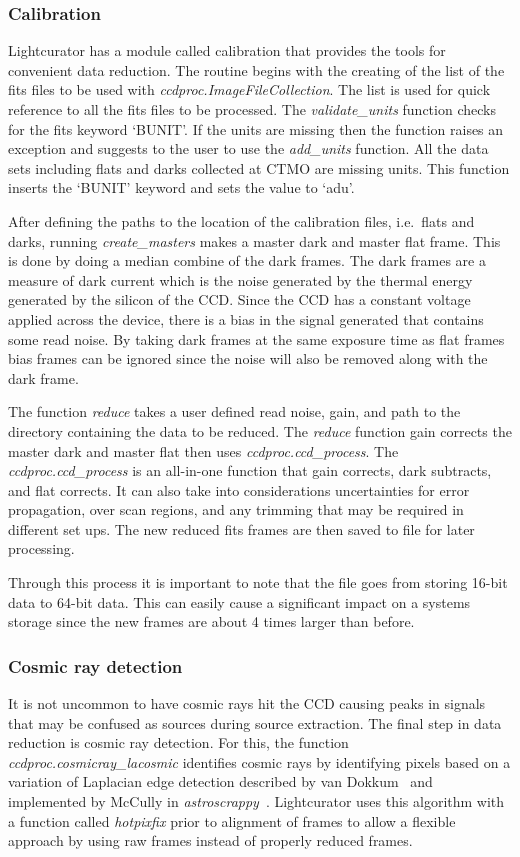 \subsubsection{Calibration}
Lightcurator has a module called calibration that provides the tools for convenient data reduction.
The routine begins with the creating of the list of the fits files to be used
with \textit{ccdproc.ImageFileCollection}.
The list is used for quick reference to all the fits files to be processed.
The \textit{validate\_units} function checks for the fits keyword `BUNIT'. 
If the units are missing then the function raises an exception and suggests
to the user to use the \textit{add\_units} function. 
All the data sets including flats and darks collected at CTMO are missing units.
This function inserts the `BUNIT' keyword and sets the value to `adu'.

After defining the paths to the location of the calibration files, i.e.\
flats and darks, running \textit{create\_masters} makes a master dark and master flat frame.
This is done by doing a median combine of the dark frames. 
The dark frames are a measure of dark current which is the noise generated by the thermal energy generated by the silicon of the CCD\@.
Since the CCD has a constant voltage applied across the device, there is a bias in the signal generated that contains some read noise.
By taking dark frames at the same exposure time as flat frames bias frames can be ignored since the noise will also be removed along
with the dark frame.

The function \textit{reduce} takes a user defined read noise, gain, and
path to the directory containing the data to be reduced. 
The \textit{reduce} function gain corrects the master dark and master flat then
uses \textit{ccdproc.ccd\_process}. 
The \textit{ccdproc.ccd\_process } is an all-in-one function that gain corrects,
dark subtracts, and flat corrects. It can also take into considerations 
uncertainties for error propagation, over scan regions, and any trimming that
may be required in different set ups.
The new reduced fits frames are then saved to file for later processing.

Through this process it is important to note that the file goes from storing
16-bit data to 64-bit data.
This can easily cause a significant impact on a systems storage
since the new frames are about 4 times larger than before.

\subsubsection{Cosmic ray detection}
It is not uncommon to have cosmic rays hit the CCD causing peaks in signals that may be confused as sources during source extraction.
The final step in data reduction is cosmic ray detection.
For this, the function \textit{ccdproc.cosmicray\_lacosmic} identifies cosmic rays by identifying pixels based on a variation of
Laplacian edge detection described by van Dokkum~\cite{lacosmic} and implemented by McCully in \textit{astroscrappy}~\cite{astroscrappy}.
Lightcurator uses this algorithm with a function called \textit{hotpixfix} prior to alignment of frames to allow a flexible
approach by using raw frames instead of properly reduced frames.

